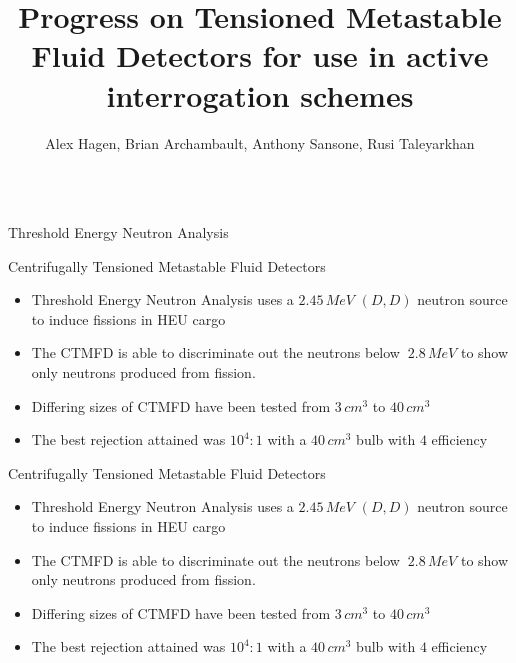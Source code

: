 

\title{Progress on Tensioned Metastable Fluid Detectors for use in active
       interrogation schemes}
\author{Alex Hagen, Brian Archambault,
        Anthony Sansone, Rusi Taleyarkhan}
\renewcommand{\today}{November 2, 1994}
\maketitle

\begin{column}

    \begin{cell}{Threshold Energy Neutron Analysis}
        \begin{subcell}{Centrifugally Tensioned Metastable Fluid Detectors}
            \begin{itemize}
                \item Threshold Energy Neutron Analysis uses a $2.45\,MeV$ $\left( D,D\right)$ neutron source to induce fissions in HEU cargo
                \item The CTMFD is able to discriminate out the neutrons below $~2.8\,MeV$ to show only neutrons produced from fission.
                \item Differing sizes of CTMFD have been tested from $3\,cm^{3}$ to $40\,cm^{3}$
                \item The best rejection attained was $10^{4}:1$ with a $40\,cm^{3}$ bulb with $4$ efficiency
            \end{itemize}
        \end{subcell}
        \begin{subcell}{Centrifugally Tensioned Metastable Fluid Detectors}
            \begin{itemize}
                \item Threshold Energy Neutron Analysis uses a $2.45\,MeV$ $\left( D,D\right)$ neutron source to induce fissions in HEU cargo
                \item The CTMFD is able to discriminate out the neutrons below $~2.8\,MeV$ to show only neutrons produced from fission.
                \item Differing sizes of CTMFD have been tested from $3\,cm^{3}$ to $40\,cm^{3}$
                \item The best rejection attained was $10^{4}:1$ with a $40\,cm^{3}$ bulb with $4$ efficiency

\end{itemize}
\end{subcell}
\end{cell}
\end{column}
